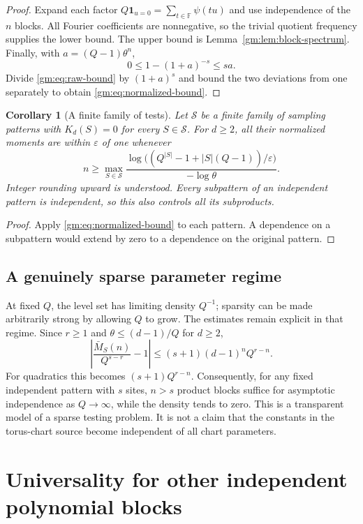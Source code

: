 \documentclass[11pt,a4paper]{article}
\numberwithin{equation}{section}
\newtheorem{corollary}[theorem]{Corollary}
\theoremstyle{definition}
\theoremstyle{remark}
\newcommand{\F}{\mathbb F}
\newcommand{\1}{\mathbf 1}
\begin{document}
\begin{proof}
Expand each factor $Q\1_{u=0}=\sum_{t\in\F}\psi(tu)$ and use independence
of the $n$ blocks. All Fourier coefficients are nonnegative, so the
trivial quotient frequency supplies the lower bound. The upper bound is
Lemma~\ref{gm:lem:block-spectrum}. Finally, with $a=(Q-1)\theta^n$,
\[
 0\leq1-(1+a)^{-s}\leq sa.
\]
Divide \eqref{gm:eq:raw-bound} by $(1+a)^s$ and bound the two deviations
from one separately to obtain \eqref{gm:eq:normalized-bound}.
\end{proof}

\begin{corollary}[A finite family of tests]
\label{gm:cor:family}
Let $\mathcal S$ be a finite family of sampling patterns with
$K_d(S)=0$ for every $S\in\mathcal S$. For $d\geq2$, all their normalized
moments are within $\varepsilon$ of one whenever
\[
 n\geq
 \max_{S\in\mathcal S}
 \frac{\log\bigl((Q^{|S|}-1+|S|(Q-1))/\varepsilon\bigr)}{-\log\theta}.
\]
Integer rounding upward is understood. Every subpattern of an independent
pattern is independent, so this also controls all its subproducts.
\end{corollary}

\begin{proof}
Apply \eqref{gm:eq:normalized-bound} to each pattern. A dependence on a
subpattern would extend by zero to a dependence on the original pattern.
\end{proof}

\subsection{A genuinely sparse parameter regime}
At fixed $Q$, the level set has limiting density $Q^{-1}$; sparsity can be
made arbitrarily strong by allowing $Q$ to grow. The estimates remain
explicit in that regime. Since $r\geq1$ and
$\theta\leq(d-1)/Q$ for $d\geq2$,
\begin{equation}\label{gm:eq:large-field}
 \left|\frac{\bar M_S(n)}{Q^{s-r}}-1\right|
 \leq (s+1)(d-1)^n Q^{r-n}.
\end{equation}
For quadratics this becomes $(s+1)Q^{r-n}$. Consequently, for any fixed
independent pattern with $s$ sites, $n>s$ product blocks suffice for
asymptotic independence as $Q\to\infty$, while the density tends to zero.
This is a transparent model of a sparse testing problem. It is not a
claim that the constants in the torus-chart source become independent of
all chart parameters.

\section{Universality for other independent polynomial blocks}
\label{gm:sec:general-polynomial}
\end{document}
